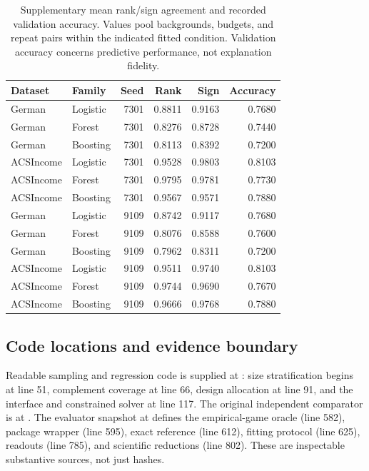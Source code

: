 \documentclass{article}
\begin{document}
\begin{table}[h]
\centering
\caption{Supplementary mean rank/sign agreement and recorded validation accuracy. Values pool backgrounds, budgets, and repeat pairs within the indicated fitted condition. Validation accuracy concerns predictive performance, not explanation fidelity.}
\label{tab:diagnostics}
\small
\begin{tabular}{@{}llrrrr@{}}
\toprule
Dataset & Family & Seed & Rank & Sign & Accuracy\\
\midrule
German & Logistic & 7301 & 0.8811 & 0.9163 & 0.7680 \\
German & Forest & 7301 & 0.8276 & 0.8728 & 0.7440 \\
German & Boosting & 7301 & 0.8113 & 0.8392 & 0.7200 \\
ACSIncome & Logistic & 7301 & 0.9528 & 0.9803 & 0.8103 \\
ACSIncome & Forest & 7301 & 0.9795 & 0.9781 & 0.7730 \\
ACSIncome & Boosting & 7301 & 0.9567 & 0.9571 & 0.7880 \\
German & Logistic & 9109 & 0.8742 & 0.9117 & 0.7680 \\
German & Forest & 9109 & 0.8076 & 0.8588 & 0.7600 \\
German & Boosting & 9109 & 0.7962 & 0.8311 & 0.7200 \\
ACSIncome & Logistic & 9109 & 0.9511 & 0.9740 & 0.8103 \\
ACSIncome & Forest & 9109 & 0.9744 & 0.9690 & 0.7670 \\
ACSIncome & Boosting & 9109 & 0.9666 & 0.9768 & 0.7880 \\
\bottomrule
\end{tabular}
\end{table}

\subsection{Code locations and evidence boundary}
Readable sampling and regression code is supplied at : size stratification begins at line 51, complement coverage at line 66, design allocation at line 91, and the interface and constrained solver at line 117. The original independent comparator is at . The evaluator snapshot at  defines the empirical-game oracle (line 582), package wrapper (line 595), exact reference (line 612), fitting protocol (line 625), readouts (line 785), and scientific reductions (line 802). These are inspectable substantive sources, not just hashes.
\end{document}
